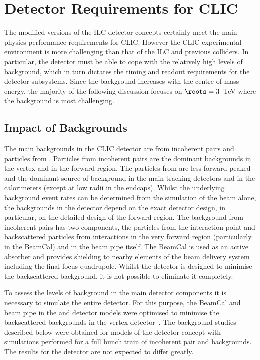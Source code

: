\section{Detector Requirements for CLIC\label{sec:chapter3:clic_detector_requirements}}

The modified versions of the ILC detector concepts certainly meet the main
physics performance requirements for CLIC\@. However the CLIC experimental
environment is more challenging than that of the ILC and previous \epem
colliders. In particular, the detector must be able to cope with the relatively
high levels of background, which in turn dictates the timing and readout
requirements for the detector subsystems. Since the background increases with the
centre-of-mass energy, the majority of the following discussion focuses on
$\roots=3$~TeV where the background is most challenging.

\subsection{Impact of Backgrounds\label{sec:chapter3:clic_detector:background_impact}}

The main backgrounds in the CLIC detector are from incoherent pairs and
particles from \gghadrons. Particles from incoherent pairs are the dominant
backgrounds in the vertex and in the forward region. The particles from
\gghadrons are less forward-peaked and the dominant source of background in the
main tracking detectors and in the calorimeters (except at low radii in the
endcaps). Whilst the underlying background event rates can be determined from the
simulation of the beam alone, the backgrounds in the detector depend on the
exact detector design, in particular, on the detailed design of the forward
region. The background from incoherent pairs has two components, the particles
from the interaction point and backscattered particles from interactions in the
very forward region (particularly in the \acs{BeamCal}) and in the beam pipe
itself. The BeamCal is used as an active absorber and provides shielding to
nearby elements of the beam delivery system including the final focus
quadrupole. Whilst the detector is designed to minimise the backscattered
background, it is not possible to eliminate it completely.

To assess the levels of background in the main detector components it is
necessary to simulate the entire detector. For this purpose, the BeamCal and
beam pipe in the \clicild and \clicsid detector models were optimised to
minimise the backscattered
backgrounds in the vertex detector~\cite{lcd:2011-DannheimSailerBgrNote}. The background studies
described below were obtained for \geant models of the \clicild detector concept
with simulations performed for a full bunch train of incoherent pair and
\gghadrons backgrounds. The results for the \clicsid detector are not expected
to differ greatly.

